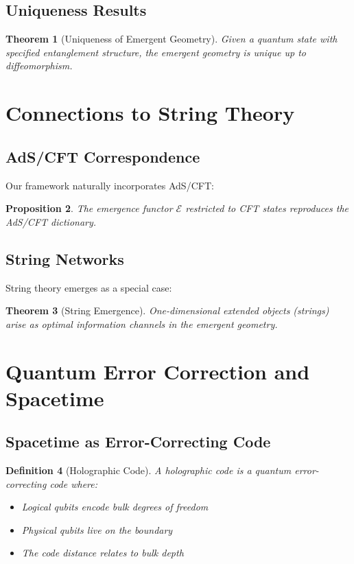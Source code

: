 \documentclass[11pt,a4paper]{article}
\newtheorem{theorem}{Theorem}[section]
\newtheorem{proposition}[theorem]{Proposition}
\newtheorem{definition}[theorem]{Definition}
\begin{document}
\subsection{Uniqueness Results}

\begin{theorem}[Uniqueness of Emergent Geometry]
Given a quantum state with specified entanglement structure, the emergent geometry is unique up to diffeomorphism.
\end{theorem}

\section{Connections to String Theory}

\subsection{AdS/CFT Correspondence}

Our framework naturally incorporates AdS/CFT:

\begin{proposition}
The emergence functor $\mathcal{E}$ restricted to CFT states reproduces the AdS/CFT dictionary.
\end{proposition}

\subsection{String Networks}

String theory emerges as a special case:

\begin{theorem}[String Emergence]
One-dimensional extended objects (strings) arise as optimal information channels in the emergent geometry.
\end{theorem}

\section{Quantum Error Correction and Spacetime}

\subsection{Spacetime as Error-Correcting Code}

\begin{definition}[Holographic Code]
A holographic code is a quantum error-correcting code where:
\begin{itemize}
\item Logical qubits encode bulk degrees of freedom
\item Physical qubits live on the boundary
\item The code distance relates to bulk depth
\end{itemize}
\end{definition}
\end{document}
